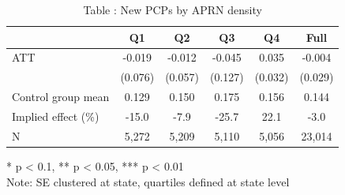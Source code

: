 \begin{table}[t]
\caption*{
{\fontsize{20}{25}\selectfont  Table : New PCPs by APRN density\fontsize{12}{15}\selectfont }
} 
\fontsize{12.0pt}{14.0pt}\selectfont
\begin{tabular*}{\linewidth}{@{\extracolsep{\fill}}lccccc}
\toprule
  & Q1 & Q2 & Q3 & Q4 & Full \\ 
\midrule\addlinespace[2.5pt]
ATT & -0.019 & -0.012 & -0.045 & 0.035 & -0.004 \\ 
 & (0.076) & (0.057) & (0.127) & (0.032) & (0.029) \\ 
Control group mean & 0.129 & 0.150 & 0.175 & 0.156 & 0.144 \\ 
Implied effect (\%) & -15.0 & -7.9 & -25.7 & 22.1 & -3.0 \\ 
N & 5,272 & 5,209 & 5,110 & 5,056 & 23,014 \\ 
\bottomrule
\end{tabular*}
\begin{minipage}{\linewidth}
* p < 0.1, ** p < 0.05, *** p < 0.01\\
Note: SE clustered at state, quartiles defined at state level\\
\end{minipage}
\end{table}

